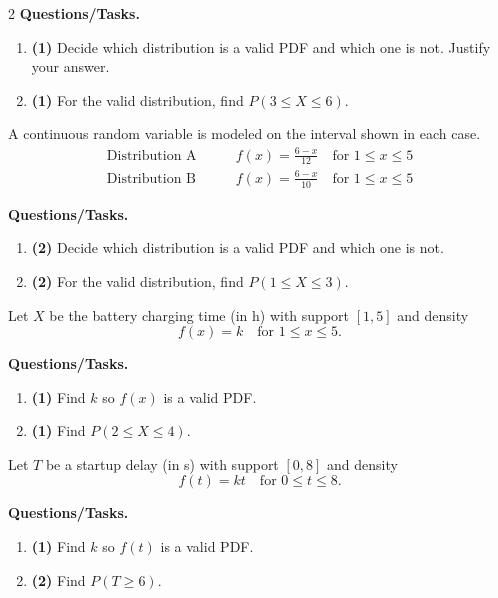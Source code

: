 \begin{multicols}{2}
		\textbf{Questions/Tasks.}
		\begin{enumerate}[label=\textbf{\alph*)}]
			\item \textbf{(1)} Decide which distribution is a valid PDF and which one is not. Justify your answer.
			\item \textbf{(1)} For the valid distribution, find $P(3\le X\le 6)$.
		\end{enumerate}
		
		\vspace{0.25cm}
		\vspace{-0.3cm}
		A continuous random variable is modeled on the interval shown in each case.
		\[ \begin{aligned}
			\text{Distribution A} & \qquad f(x)=\frac{6-x}{12}\quad\text{for }1\le x\le 5 \\
			\text{Distribution B} & \qquad f(x)=\frac{6-x}{10}\quad\text{for }1\le x\le 5
		\end{aligned}
		\]
		
		\textbf{Questions/Tasks.}
		\begin{enumerate}[label=\textbf{\alph*)}]
			\item \textbf{(2)} Decide which distribution is a valid PDF and which one is not.
			\item \textbf{(2)} For the valid distribution, find $P(1\le X\le 3)$.
		\end{enumerate}
		
		\vspace{0.25cm}
		\vspace{-0.3cm}
		Let $X$ be the battery charging time (in h) with support $[1,5]$ and density
		\[
		f(x)=k\quad\text{for }1\le x\le 5.
		\]
		
		\textbf{Questions/Tasks.}
		\begin{enumerate}[label=\textbf{\alph*)}]
			\item \textbf{(1)} Find $k$ so $f(x)$ is a valid PDF.
			\item \textbf{(1)} Find $P(2\le X\le 4)$.
		\end{enumerate}
		
		\vspace{0.25cm}
		\vspace{-0.25cm}
		Let $T$ be a startup delay (in s) with support $[0,8]$ and density
		\[
		f(t)=kt\quad\text{for }0\le t\le 8.
		\]
		
		\textbf{Questions/Tasks.}
		\begin{enumerate}[label=\textbf{\alph*)}]
			\item \textbf{(1)} Find $k$ so $f(t)$ is a valid PDF.
			\item \textbf{(2)} Find $P(T\ge 6)$.
		\end{enumerate}
		

\end{multicols}
